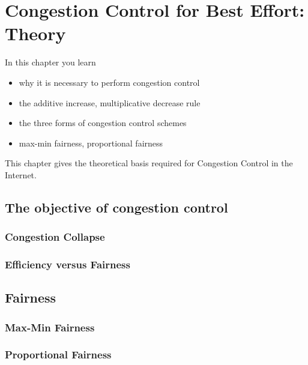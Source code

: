 \chapter{Congestion Control for Best Effort: Theory}
\label{d31}
In this chapter you learn
\begin{itemize}
        \item  why it is necessary to perform congestion control

        \item  the additive increase, multiplicative decrease rule

        \item  the three forms of congestion control schemes

        \item  max-min fairness, proportional fairness

\end{itemize}

This chapter gives the theoretical basis required for Congestion Control in the Internet.

\section{The objective of congestion control}

\subsection{Congestion Collapse}
\label{sec-d31-why}

\subsection{Efficiency versus Fairness}



\section{Fairness}

\subsection{Max-Min Fairness}

\subsection{Proportional Fairness}

